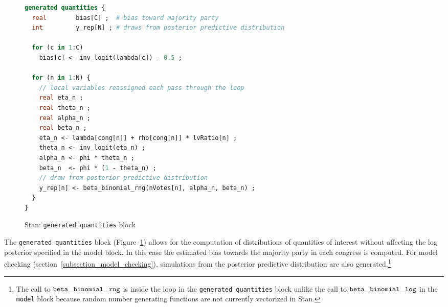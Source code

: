 \begin{figure}[t]
\begin{lstlisting}[language=Stan, frame=trBL]
generated quantities {
  real        bias[C] ;  # bias toward majority party
  int         y_rep[N] ; # draws from posterior predictive distribution
  
  for (c in 1:C) 
    bias[c] <- inv_logit(lambda[c]) - 0.5 ;
  
  for (n in 1:N) {
    // local variables reassigned each pass through the loop
    real eta_n ;
    real theta_n ;
    real alpha_n ;
    real beta_n ;
    eta_n <- lambda[cong[n]] + rho[cong[n]] * lvRatio[n] ;
    theta_n <- inv_logit(eta_n) ;    
    alpha_n <- phi * theta_n ;
    beta_n  <- phi * (1 - theta_n) ;
    // draw from posterior predictive distribution
    y_rep[n] <- beta_binomial_rng(nVotes[n], alpha_n, beta_n) ;
  }
}
\end{lstlisting}
\caption{Stan: {\tt generated quantities} block}
\label{stan_generated_quantities}
\end{figure}

The {\tt generated quantities} block (Figure~\ref{stan_generated_quantities}) allows for the computation of distributions of quantities of interest without affecting the log posterior specified in the model block. In this case the estimated bias towards the majority party in each congress is computed. For model checking (section~\ref{subsection_model_checking}), simulations from the posterior predictive distribution are also generated.\footnote{The call to ${\tt beta\_binomial\_rng}$ is inside the loop in the {\tt generated quantities} block unlike the call to ${\tt beta\_binomial\_log}$ in the {\tt model} block because random number generating functions are not currently vectorized in Stan.} 


